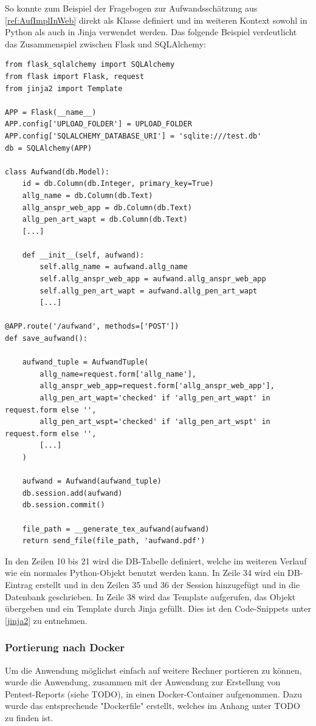 So konnte zum Beispiel der Fragebogen zur Aufwandsschätzung aus \ref{ref:AufImplInWeb} direkt als Klasse definiert und im weiteren Kontext sowohl in Python als auch in Jinja verwendet werden. Das folgende Beispiel verdeutlicht das Zusammenspiel zwischen Flask und SQLAlchemy: 
\lstset{language=Python}
\begin{lstlisting}
from flask_sqlalchemy import SQLAlchemy
from flask import Flask, request
from jinja2 import Template

APP = Flask(__name__)
APP.config['UPLOAD_FOLDER'] = UPLOAD_FOLDER
APP.config['SQLALCHEMY_DATABASE_URI'] = 'sqlite:///test.db'
db = SQLAlchemy(APP)

class Aufwand(db.Model):
    id = db.Column(db.Integer, primary_key=True)
    allg_name = db.Column(db.Text)
    allg_anspr_web_app = db.Column(db.Text)
    allg_pen_art_wapt = db.Column(db.Text)
    [...]

    def __init__(self, aufwand):
        self.allg_name = aufwand.allg_name
        self.allg_anspr_web_app = aufwand.allg_anspr_web_app
        self.allg_pen_art_wapt = aufwand.allg_pen_art_wapt
        [...]
        
@APP.route('/aufwand', methods=['POST'])
def save_aufwand():

    aufwand_tuple = AufwandTuple(
        allg_name=request.form['allg_name'],
        allg_anspr_web_app=request.form['allg_anspr_web_app'],
        allg_pen_art_wapt='checked' if 'allg_pen_art_wapt' in request.form else '',
        allg_pen_art_wspt='checked' if 'allg_pen_art_wspt' in request.form else '',
        [...]
    )

    aufwand = Aufwand(aufwand_tuple)
    db.session.add(aufwand)
    db.session.commit()

    file_path = __generate_tex_aufwand(aufwand)
    return send_file(file_path, 'aufwand.pdf')
\end{lstlisting}
In den Zeilen 10 bis 21 wird die DB-Tabelle definiert, welche im weiteren Verlauf wie ein normales Python-Objekt benutzt werden kann. In Zeile 34 wird ein DB-Eintrag erstellt und in den Zeilen 35 und 36 der Session hinzugefügt und in die Datenbank geschrieben. In Zeile 38 wird das Template aufgerufen, das Objekt übergeben und ein Template durch Jinja gefüllt. Dies ist den Code-Snippets unter \ref{jinja2} zu entnehmen.

\subsubsection{Portierung nach Docker}
Um die Anwendung möglichst einfach auf weitere Rechner portieren zu können, wurde die Anwendung, zusammen mit der Anwendung zur Erstellung von Pentest-Reports (siehe TODO), in einen Docker-Container aufgenommen. Dazu wurde das entsprechende "Dockerfile" erstellt, welches im Anhang unter TODO zu finden ist.\\

